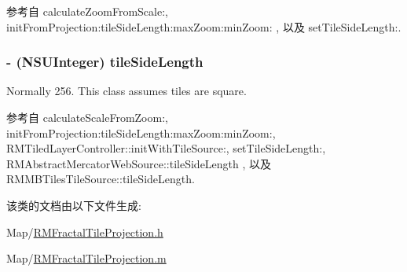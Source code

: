 参考自 calculate\-Zoom\-From\-Scale\-:, init\-From\-Projection\-:tile\-Side\-Length\-:max\-Zoom\-:min\-Zoom\-: , 以及 set\-Tile\-Side\-Length\-:.

\hypertarget{interface_r_m_fractal_tile_projection_ad84192b0999b267f8fbccd827eeab01e}{
\subsubsection[{tile\-Side\-Length}]{\setlength{\rightskip}{0pt plus 5cm}-\/ (N\-S\-U\-Integer) tile\-Side\-Length\hspace{0.3cm}{\ttfamily [protected]}}}\label{interface_r_m_fractal_tile_projection_ad84192b0999b267f8fbccd827eeab01e}


Normally 256. This class assumes tiles are square. 



参考自 calculate\-Scale\-From\-Zoom\-:, init\-From\-Projection\-:tile\-Side\-Length\-:max\-Zoom\-:min\-Zoom\-:, R\-M\-Tiled\-Layer\-Controller\-::init\-With\-Tile\-Source\-:, set\-Tile\-Side\-Length\-:, R\-M\-Abstract\-Mercator\-Web\-Source\-::tile\-Side\-Length , 以及 R\-M\-M\-B\-Tiles\-Tile\-Source\-::tile\-Side\-Length.



该类的文档由以下文件生成\-:\begin{DoxyCompactItemize}
\item 
Map/\hyperlink{_r_m_fractal_tile_projection_8h}{R\-M\-Fractal\-Tile\-Projection.\-h}\item 
Map/\hyperlink{_r_m_fractal_tile_projection_8m}{R\-M\-Fractal\-Tile\-Projection.\-m}\end{DoxyCompactItemize}
